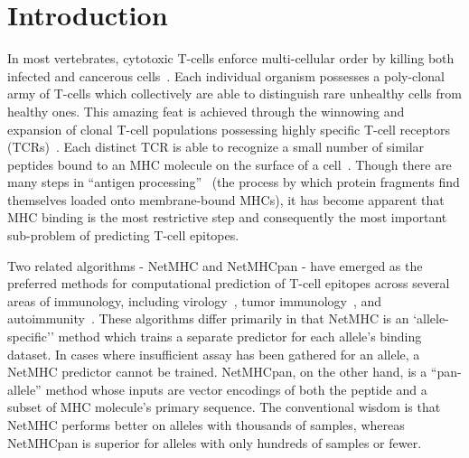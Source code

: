 \section{Introduction}
In most vertebrates, cytotoxic T-cells enforce multi-cellular order by killing both infected and cancerous cells~\cite{Anderson_2004}. Each individual organism possesses a poly-clonal army of T-cells which collectively are able to distinguish rare unhealthy cells from healthy ones. This amazing feat is achieved through the winnowing and expansion of clonal T-cell populations possessing highly specific T-cell receptors (TCRs)~\cite{Blackman_1990}. Each distinct TCR is able to recognize a small number of similar peptides bound to an MHC molecule on the surface of a cell~\cite{Huseby_2005}. Though there are many steps in ``antigen processing''~\cite{Cresswell_2005} (the process by which protein fragments find themselves loaded onto membrane-bound MHCs), it has become apparent that MHC binding is the most restrictive step and consequently the most important sub-problem of predicting T-cell epitopes. 

Two related algorithms - NetMHC and NetMHCpan - have emerged as the preferred methods for computational prediction of T-cell epitopes across several areas of immunology, including virology~\cite{Lund_2011}, tumor immunology~\cite{Gubin_2015}, and autoimmunity~\cite{Abreu_2012}. These algorithms differ primarily in that NetMHC is an `allele-specific'' method which trains a separate predictor for each allele's binding dataset. In cases where insufficient assay has been gathered for an allele, a NetMHC predictor cannot be trained. NetMHCpan, on the other hand, is a ``pan-allele'' method whose inputs are vector encodings of both the peptide and a subset of MHC molecule's primary sequence. The conventional wisdom is that NetMHC performs better on alleles with thousands of samples, whereas NetMHCpan is superior for alleles with only hundreds of samples or fewer. 


